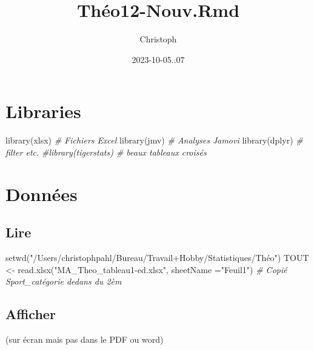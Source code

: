 \documentclass[
]{article}
\title{Théo12-Nouv.Rmd}
\author{Christoph}
\date{2023-10-05..07}
\newenvironment{Shaded}{\begin{snugshade}}{\end{snugshade}}
\newcommand{\AttributeTok}[1]{\textcolor[rgb]{0.77,0.63,0.00}{#1}}
\newcommand{\CommentTok}[1]{\textcolor[rgb]{0.56,0.35,0.01}{\textit{#1}}}
\newcommand{\FunctionTok}[1]{\textcolor[rgb]{0.00,0.00,0.00}{#1}}
\newcommand{\NormalTok}[1]{#1}
\newcommand{\OtherTok}[1]{\textcolor[rgb]{0.56,0.35,0.01}{#1}}
\newcommand{\StringTok}[1]{\textcolor[rgb]{0.31,0.60,0.02}{#1}}
\begin{document}
\maketitle

\hypertarget{libraries}{%
\section{Libraries}\label{libraries}}

\begin{Shaded}
\begin{Highlighting}[]
\FunctionTok{library}\NormalTok{(xlsx)                                         }\CommentTok{\# Fichiers Excel}
\FunctionTok{library}\NormalTok{(jmv)                                          }\CommentTok{\# Analyses Jamovi}
\FunctionTok{library}\NormalTok{(dplyr)                                        }\CommentTok{\# filter etc.}
\CommentTok{\#library(tigerstats)                                   \# beaux tableaux croisés}
\end{Highlighting}
\end{Shaded}

\hypertarget{donnuxe9es}{%
\section{Données}\label{donnuxe9es}}

\hypertarget{lire}{%
\subsection{Lire}\label{lire}}

\begin{Shaded}
\begin{Highlighting}[]
\FunctionTok{setwd}\NormalTok{(}\StringTok{"/Users/christophpahl/Bureau/Travail+Hobby/Statistiques/Théo"}\NormalTok{)}
\NormalTok{TOUT }\OtherTok{\textless{}{-}} \FunctionTok{read.xlsx}\NormalTok{(}\StringTok{"MA\_Theo\_tableau1{-}ed.xlsx"}\NormalTok{, }\AttributeTok{sheetName =}\StringTok{"Feuil1"}\NormalTok{)    }\CommentTok{\# Copié Sport\_catégorie dedans du 2èm}
\end{Highlighting}
\end{Shaded}

\hypertarget{afficher}{%
\subsection{Afficher}\label{afficher}}

(sur écran mais pas dans le PDF ou word)
\end{document}
